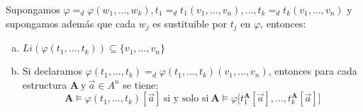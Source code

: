   \begin{lemma} \label{lemma_64}
    \PN Supongamos $\varphi =_{d} \varphi(w_{1}, \dotsc, w_{k}), t_{1} =_{d} t_{1}(v_{1}, \dotsc, v_{n}), \dotsc, t_{k}
    =_{d} t_{k}(v_{1}, \dotsc, v_{n})$ y supongamos además que cada $w_{j}$ es sustituible por $t_{j}$ en $\varphi$,
    entonces:
    \begin{enumerate}[(a)]
      \item $Li(\varphi(t_{1}, \dotsc, t_{k})) \subseteq \{v_{1}, \dotsc, v_{n}\}$
      \item Si declaramos $\varphi(t_{1}, \dotsc, t_{k}) =_{d} \varphi(t_{1}, \dotsc, t_{k})(v_{1}, \dotsc, v_{n})$,
      entonces para cada estructura $\mathbf{A} \ \text{y} \ \vec{a} \in A^{n}$ se tiene:
        \[
          \mathbf{A} \models \varphi(t_{1}, \dotsc, t_{k})[\vec{a}] \ \text{si y solo si} \ \mathbf{A} \models \varphi
          \lbrack t_{1}^{\mathbf{A}}[\vec{a}], \dotsc, t_{k}^{ \mathbf{A}}[\vec{a}]]
        \]
    \end{enumerate}
  \end{lemma}
